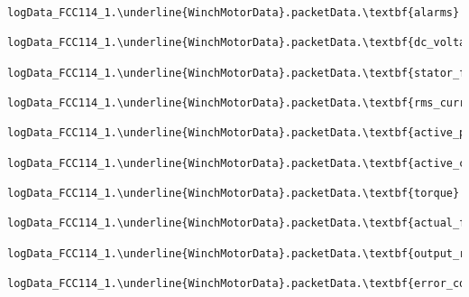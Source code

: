 \documentclass[10pt]{extarticle}
\begin{document}
\begin{Verbatim}[baselinestretch=.9,commandchars=\\\{\}]
logData_FCC114_1.\underline{WinchMotorData}.packetData.\textbf{alarms}

logData_FCC114_1.\underline{WinchMotorData}.packetData.\textbf{dc_voltage}

logData_FCC114_1.\underline{WinchMotorData}.packetData.\textbf{stator_freq}

logData_FCC114_1.\underline{WinchMotorData}.packetData.\textbf{rms_current}

logData_FCC114_1.\underline{WinchMotorData}.packetData.\textbf{active_power}

logData_FCC114_1.\underline{WinchMotorData}.packetData.\textbf{active_current}

logData_FCC114_1.\underline{WinchMotorData}.packetData.\textbf{torque}

logData_FCC114_1.\underline{WinchMotorData}.packetData.\textbf{actual_freq}

logData_FCC114_1.\underline{WinchMotorData}.packetData.\textbf{output_rms_voltage}

logData_FCC114_1.\underline{WinchMotorData}.packetData.\textbf{error_count}
\end{Verbatim}
\end{document}
